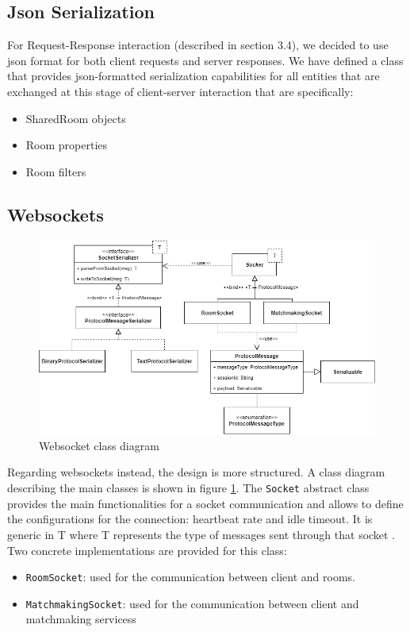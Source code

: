 \subsection{Json Serialization}
For Request-Response interaction (described in section 3.4), we decided to use json format for both client requests and server responses. We have defined a class that provides json-formatted serialization capabilities for all entities that are exchanged at this stage of client-server interaction that are specifically:
\begin{itemize}
	\item SharedRoom objects
	\item Room properties
	\item Room filters
\end{itemize}

\subsection{Websockets}
\begin{figure}[h]
	\hspace*{-0.5in}
	\includegraphics[scale=0.6]{images/4-design/communication_protocol.png}
	\caption{Websocket class diagram}
	\label{fig:websocket_communication_design}
\end{figure}
Regarding websockets instead, the design is more structured. A class diagram describing the main classes is shown in figure \ref{fig:websocket_communication_design}.
The \texttt{Socket} abstract class provides the main functionalities for a socket communication and allows to define the configurations for the connection: heartbeat rate and idle timeout. It is generic in T where T represents the type of messages sent through that socket . Two concrete implementations are provided for this class:
\begin{itemize}
	\item \texttt{RoomSocket}: used for the communication between client and rooms.
	\item \texttt{MatchmakingSocket}: used for the communication between client and matchmaking servicess
\end{itemize}
